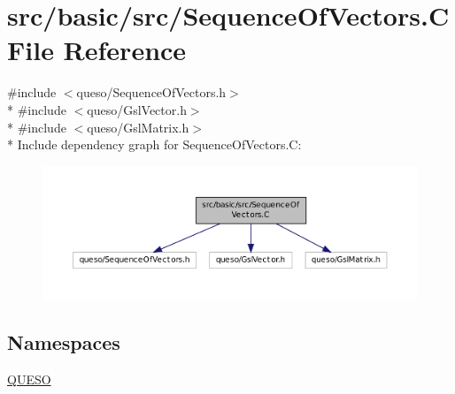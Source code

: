 \hypertarget{_sequence_of_vectors_8_c}{\section{src/basic/src/\-Sequence\-Of\-Vectors.C File Reference}
\label{_sequence_of_vectors_8_c}
}
{\ttfamily \#include $<$queso/\-Sequence\-Of\-Vectors.\-h$>$}\\*
{\ttfamily \#include $<$queso/\-Gsl\-Vector.\-h$>$}\\*
{\ttfamily \#include $<$queso/\-Gsl\-Matrix.\-h$>$}\\*
Include dependency graph for Sequence\-Of\-Vectors.\-C\-:
\nopagebreak
\begin{figure}[H]
\begin{center}
\leavevmode
\includegraphics[width=350pt]{_sequence_of_vectors_8_c__incl}
\end{center}
\end{figure}
\subsection*{Namespaces}
\begin{DoxyCompactItemize}
\item 
\hyperlink{namespace_q_u_e_s_o}{Q\-U\-E\-S\-O}
\end{DoxyCompactItemize}

